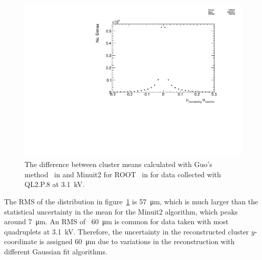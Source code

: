 \begin{figure}
    \centering
    \includegraphics[width = \textwidth]{figures/figure_QL2P08_3100V_2021-05-21_reclustering_plots_mu_reclustering_minus_mu_cosmics.pdf}
    \caption{The difference between cluster means calculated with Guo's method~\cite{guo_simple_2011} in  and Minuit2 for ROOT~\cite{hatlo_developments_2005} in  for data collected with QL2.P.8 at 3.1~kV.}
    \label{fig:mu_reclustering_minus_mu_cosmics}
\end{figure}

The RMS of the distribution in figure~\ref{fig:mu_reclustering_minus_mu_cosmics} is \SI{57}{\micro\meter}, which is much larger than the statistical uncertainty in the mean for the Minuit2 algorithm, which peaks around \SI{7}{\micro\meter}. An RMS of ~\SI{60}{\micro\meter} is common for data taken with most quadruplets at 3.1~kV. Therefore, the uncertainty in the reconstructed cluster $y$-coordinate is assigned \SI{60}{\micro\meter} due to variations in the reconstruction with different Gaussian fit algorithms.


